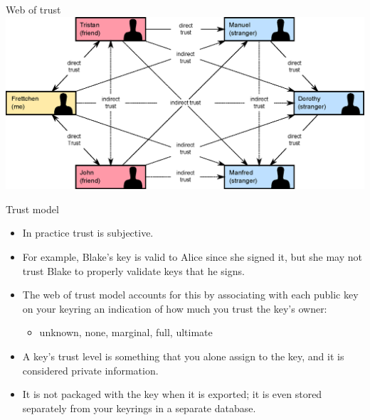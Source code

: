 \documentclass[
mode=present,
paper=smartboard,
size=20pt,
]{powerdot}
\begin{document}
\begin{slide}[toc=]{Web of trust}
\centering\includegraphics[width=\linewidth]{images/Web_of_Trust.eps}
\end{slide}

\begin{slide}{Trust model}
  \begin{itemize}
  \item In practice trust is subjective.
  \item For example, Blake's key is valid to Alice since she signed
    it, but she may not trust Blake to properly validate keys that he
    signs.
  \item The web of trust model accounts for this by associating with
    each public key on your keyring an indication of how much you
    trust the key's owner:
    \begin{itemize}
    \item unknown, none, marginal, full, ultimate
    \end{itemize}
  \item A key's trust level is something that you alone assign to the
    key, and it is considered private information.
  \item It is not packaged with the key when it is exported; it is
    even stored separately from your keyrings in a separate database.
  \end{itemize}
\end{slide}
\end{document}
